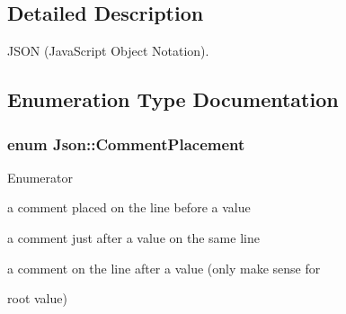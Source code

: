 \subsection{Detailed Description}
J\+S\+O\+N (Java\+Script Object Notation). 

\subsection{Enumeration Type Documentation}
\hypertarget{namespace_json_a4fc417c23905b2ae9e2c47d197a45351}{
\subsubsection[{Comment\+Placement}]{\setlength{\rightskip}{0pt plus 5cm}enum {\bf Json\+::\+Comment\+Placement}}}\label{namespace_json_a4fc417c23905b2ae9e2c47d197a45351}
\begin{Desc}
\item[Enumerator]\par
\begin{description}
\item[{\em 
\hypertarget{namespace_json_a4fc417c23905b2ae9e2c47d197a45351a52f1733775460517b2ea6bedf4906d52}{comment\+Before}\label{namespace_json_a4fc417c23905b2ae9e2c47d197a45351a52f1733775460517b2ea6bedf4906d52}
}]a comment placed on the line before a value \item[{\em 
\hypertarget{namespace_json_a4fc417c23905b2ae9e2c47d197a45351a008a230a0586de54f30b76afe70fdcfa}{comment\+After\+On\+Same\+Line}\label{namespace_json_a4fc417c23905b2ae9e2c47d197a45351a008a230a0586de54f30b76afe70fdcfa}
}]a comment just after a value on the same line \item[{\em 
\hypertarget{namespace_json_a4fc417c23905b2ae9e2c47d197a45351ac5784ca53b12250888ddb642b06aebef}{comment\+After}\label{namespace_json_a4fc417c23905b2ae9e2c47d197a45351ac5784ca53b12250888ddb642b06aebef}
}]a comment on the line after a value (only make sense for \item[{\em 
\hypertarget{namespace_json_a4fc417c23905b2ae9e2c47d197a45351abcbd3eb00417335e094e4a03379659b5}{number\+Of\+Comment\+Placement}\label{namespace_json_a4fc417c23905b2ae9e2c47d197a45351abcbd3eb00417335e094e4a03379659b5}
}]root value) \end{description}
\end{Desc}

